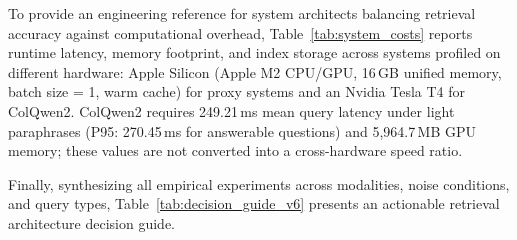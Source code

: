 \documentclass[conference]{IEEEtran}
\begin{document}
To provide an engineering reference for system architects balancing retrieval accuracy against computational overhead, Table~\ref{tab:system_costs} reports runtime latency, memory footprint, and index storage across systems profiled on different hardware: Apple Silicon (Apple M2 CPU/GPU, 16\,GB unified memory, batch size = 1, warm cache) for proxy systems and an Nvidia Tesla T4 for ColQwen2. ColQwen2 requires 249.21\,ms mean query latency under light paraphrases (P95: 270.45\,ms for answerable questions) and 5,964.7\,MB GPU memory; these values are not converted into a cross-hardware speed ratio.

\begin{table}[t]
\centering
\small
\caption{Computational Resource and Latency Profile Across Retrieval Systems ($N=813$ Index Pool, Apple M2 CPU/GPU, 16\,GB RAM, Batch Size = 1, Warm Cache; ColQwen2 Profiled on Nvidia Tesla T4 GPU).}\label{tab:system_costs}
\end{table}

Finally, synthesizing all empirical experiments across modalities, noise conditions, and query types, Table~\ref{tab:decision_guide_v6} presents an actionable retrieval architecture decision guide.
\end{document}
